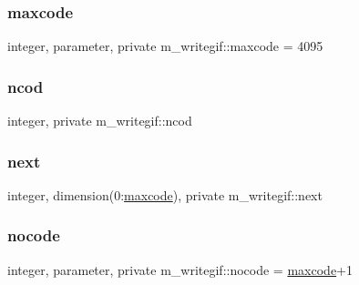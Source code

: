\mbox{\label{namespacem__writegif_ac55f9abf33971ad396b2ae59b288b0bb}} 
\subsubsection{\texorpdfstring{maxcode}{maxcode}}
{\footnotesize\ttfamily integer, parameter, private m\+\_\+writegif\+::maxcode = 4095\hspace{0.3cm}{\ttfamily [private]}}

\mbox{\label{namespacem__writegif_aac26e9673fe5e79908a6ff576a298986}} 
\subsubsection{\texorpdfstring{ncod}{ncod}}
{\footnotesize\ttfamily integer, private m\+\_\+writegif\+::ncod\hspace{0.3cm}{\ttfamily [private]}}

\mbox{\label{namespacem__writegif_a592346fdf478d7727c143cd25ece2a96}} 
\subsubsection{\texorpdfstring{next}{next}}
{\footnotesize\ttfamily integer, dimension(0\+:\mbox{\hyperlink{namespacem__writegif_ac55f9abf33971ad396b2ae59b288b0bb}{maxcode}}), private m\+\_\+writegif\+::next\hspace{0.3cm}{\ttfamily [private]}}

\mbox{\label{namespacem__writegif_a39141257b89b2cea89b4db4e0a372ffa}} 
\subsubsection{\texorpdfstring{nocode}{nocode}}
{\footnotesize\ttfamily integer, parameter, private m\+\_\+writegif\+::nocode = \mbox{\hyperlink{namespacem__writegif_ac55f9abf33971ad396b2ae59b288b0bb}{maxcode}}+1\hspace{0.3cm}{\ttfamily [private]}}

